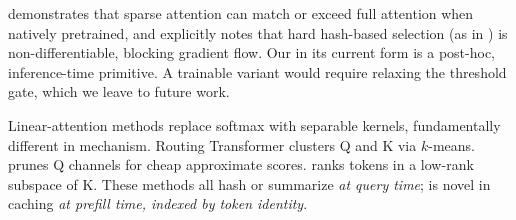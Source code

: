  \nsa \citep{deepseek2025nsa} demonstrates that sparse attention can match or exceed full attention when natively pretrained, and explicitly notes that hard hash-based selection (as in \magicpig) is non-differentiable, blocking gradient flow. Our \hma in its current form is a post-hoc, inference-time primitive. A trainable variant would require relaxing the threshold gate, which we leave to future work.

 Linear-attention methods \citep{performer,linear-transformers} replace softmax with separable kernels, fundamentally different in mechanism. Routing Transformer \citep{routing-transformer} clusters Q and K via $k$-means. \cite{ribar2023sparq} prunes Q channels for cheap approximate scores. \cite{loki2024} ranks tokens in a low-rank subspace of K. These methods all hash or summarize \emph{at query time}; \hma is novel in caching \emph{at prefill time, indexed by token identity}.
